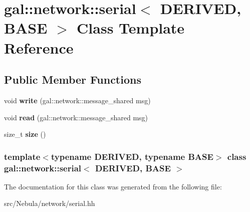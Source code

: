 \hypertarget{classgal_1_1network_1_1serial}{\section{gal\-:\-:network\-:\-:serial$<$ \-D\-E\-R\-I\-V\-E\-D, \-B\-A\-S\-E $>$ \-Class \-Template \-Reference}
\label{classgal_1_1network_1_1serial}
}
\subsection*{\-Public \-Member \-Functions}
\begin{DoxyCompactItemize}
\item 
\hypertarget{classgal_1_1network_1_1serial_ab4049343e023fb2e57e8bc4fee306300}{void {\bfseries write} (gal\-::network\-::message\-\_\-shared msg)}\label{classgal_1_1network_1_1serial_ab4049343e023fb2e57e8bc4fee306300}

\item 
\hypertarget{classgal_1_1network_1_1serial_a9b2c7927aff4750ab8be49f7849aa736}{void {\bfseries read} (gal\-::network\-::message\-\_\-shared msg)}\label{classgal_1_1network_1_1serial_a9b2c7927aff4750ab8be49f7849aa736}

\item 
\hypertarget{classgal_1_1network_1_1serial_a933ac0cf62f984b824549498c99c4cc1}{size\-\_\-t {\bfseries size} ()}\label{classgal_1_1network_1_1serial_a933ac0cf62f984b824549498c99c4cc1}

\end{DoxyCompactItemize}
\subsubsection*{template$<$typename D\-E\-R\-I\-V\-E\-D, typename B\-A\-S\-E$>$ class gal\-::network\-::serial$<$ D\-E\-R\-I\-V\-E\-D, B\-A\-S\-E $>$}



\-The documentation for this class was generated from the following file\-:\begin{DoxyCompactItemize}
\item 
src/\-Nebula/network/serial.\-hh\end{DoxyCompactItemize}
